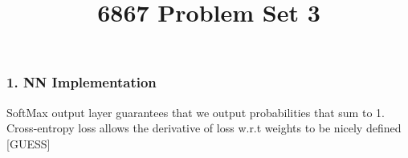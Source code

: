 \documentclass[10pt]{article}
\begin{document}
	\title{6867 Problem Set 3}
	\maketitle

    \subsubsection*{1. NN Implementation}
     SoftMax output layer guarantees that we output probabilities that sum to 1.
     Cross-entropy loss allows the derivative of loss w.r.t weights to be nicely defined [GUESS]
\end{document}

